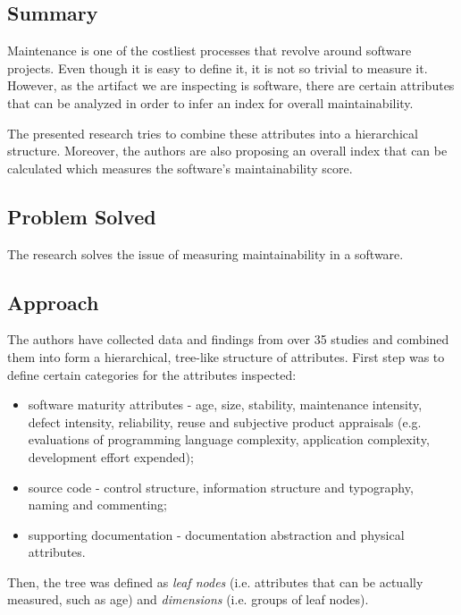 \documentclass[a4paper,12pt]{article}
\begin{document}
\subsection{Summary}

Maintenance is one of the costliest processes that revolve around software projects.
Even though it is easy to define it, it is not so trivial to measure it. However, 
as the artifact we are inspecting is software, there are certain attributes that 
can be analyzed in order to infer an index for overall maintainability. 

The presented research tries to combine these attributes into a hierarchical structure.
Moreover, the authors are also proposing an overall index that can be calculated 
which measures the software's maintainability score.

\subsection{Problem Solved}

The research solves the issue of measuring maintainability in a software. 

\subsection{Approach}

The authors have collected data and findings from over 35 studies and combined
them into form a hierarchical, tree-like structure of attributes. First step was to
define certain categories for the attributes inspected:

\begin{itemize}
  \item software maturity attributes - age, size, stability, maintenance intensity,
    defect intensity, reliability, reuse and subjective product appraisals (e.g.  
    evaluations of programming language complexity, application complexity, 
    development effort expended);
  \item source code - control structure, information structure and typography, 
    naming and commenting;
  \item supporting documentation - documentation abstraction and physical attributes.
\end{itemize}

Then, the tree was defined as \emph{leaf nodes} (i.e. attributes that can be 
actually measured, such as age) and \emph{dimensions} (i.e. groups of leaf nodes).
\end{document}
